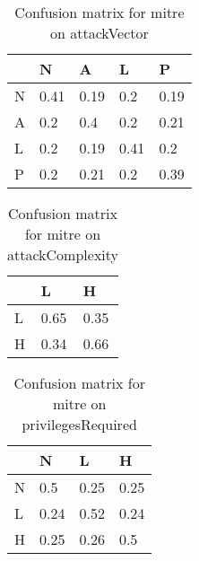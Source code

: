 \documentclass[11pt]{article}
\begin{document}
 \\



\begin{table}
	\caption{Confusion matrix for mitre on attackVector}
	\label{table:mitre-attackVector}
	\begin{center}
		\begin{tabular}{l|l|l|l|l}\textbf{} & \textbf{N} & \textbf{A} & \textbf{L} & \textbf{P} \\
               \hline
               N                    & 0.41       & 0.19       & 0.2        & 0.19       \\
               A                    & 0.2        & 0.4        & 0.2        & 0.21       \\
               L                    & 0.2        & 0.19       & 0.41       & 0.2        \\
               P                    & 0.2        & 0.21       & 0.2        & 0.39       \\
		\end{tabular}
	\end{center}
\end{table}


\begin{table}
	\caption{Confusion matrix for mitre on attackComplexity}
	\label{table:mitre-attackComplexity}
	\begin{center}
		\begin{tabular}{l|l|l}\textbf{} & \textbf{L} & \textbf{H} \\
               \hline
               L                & 0.65       & 0.35       \\
               H                & 0.34       & 0.66       \\
		\end{tabular}
	\end{center}
\end{table}


\begin{table}
	\caption{Confusion matrix for mitre on privilegesRequired}
	\label{table:mitre-privilegesRequired}
	\begin{center}
		\begin{tabular}{l|l|l|l}\textbf{} & \textbf{N} & \textbf{L} & \textbf{H} \\
               \hline
               N                  & 0.5        & 0.25       & 0.25       \\
               L                  & 0.24       & 0.52       & 0.24       \\
               H                  & 0.25       & 0.26       & 0.5        \\
		\end{tabular}
	\end{center}
\end{table}
\end{document}
